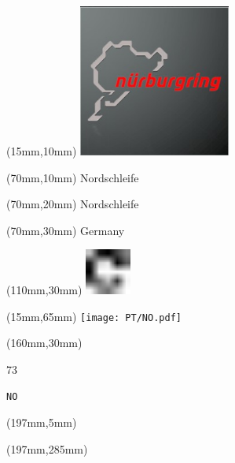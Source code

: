 \null\newpage
\begin{textblock*}{50mm}(15mm,10mm)%
\includegraphics[width=50mm]{LG/2015-05-20_00088.png}
\end{textblock*}
\begin{textblock*}{130mm}(70mm,10mm)%
{\fontsize{20}{20}\selectfont Nordschleife}\\
\end{textblock*}
\begin{textblock*}{120mm}(70mm,20mm)%
{\fontsize{16}{16}\selectfont Nordschleife}\\
\end{textblock*}
\begin{textblock*}{120mm}(70mm,30mm)%
{\fontsize{12}{12}\selectfont Germany}
\end{textblock*}
\begin{textblock*}{30mm}(110mm,30mm)%
\centering
\includegraphics[height=15mm]{icons/fa-rotate-right.pdf}
\end{textblock*}
\begin{textblock*}{185mm}(15mm,65mm)%
\centering
\mbox{\texttt{[image: PT/NO.pdf]}}
\end{textblock*}
\begin{textblock*}{40mm}(160mm,30mm)%
\Large
\par{} 
\par73 
\par\hfill\tiny\tt NO\\
\end{textblock*}
\begin{textblock*}{20mm}(197mm,5mm)%
\fbox{\thepage}
\label{NO}
\end{textblock*}
\begin{textblock*}{20mm}(197mm,285mm)%
\fbox{\thepage}
\end{textblock*}

